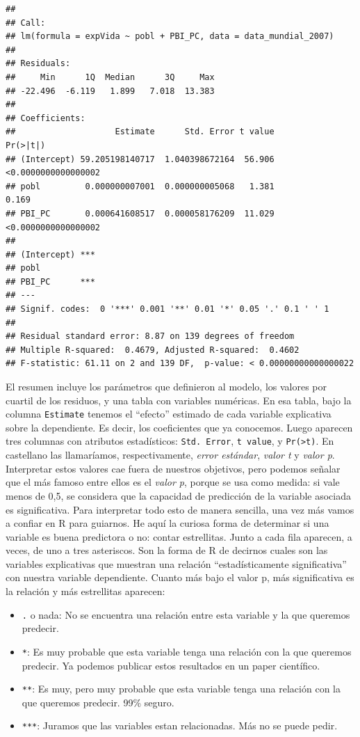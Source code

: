 \documentclass[]{book}
\providecommand{\tightlist}{%
  \setlength{\itemsep}{0pt}\setlength{\parskip}{0pt}}
\begin{document}
\begin{verbatim}
## 
## Call:
## lm(formula = expVida ~ pobl + PBI_PC, data = data_mundial_2007)
## 
## Residuals:
##     Min      1Q  Median      3Q     Max 
## -22.496  -6.119   1.899   7.018  13.383 
## 
## Coefficients:
##                    Estimate      Std. Error t value            Pr(>|t|)
## (Intercept) 59.205198140717  1.040398672164  56.906 <0.0000000000000002
## pobl         0.000000007001  0.000000005068   1.381               0.169
## PBI_PC       0.000641608517  0.000058176209  11.029 <0.0000000000000002
##                
## (Intercept) ***
## pobl           
## PBI_PC      ***
## ---
## Signif. codes:  0 '***' 0.001 '**' 0.01 '*' 0.05 '.' 0.1 ' ' 1
## 
## Residual standard error: 8.87 on 139 degrees of freedom
## Multiple R-squared:  0.4679, Adjusted R-squared:  0.4602 
## F-statistic: 61.11 on 2 and 139 DF,  p-value: < 0.00000000000000022
\end{verbatim}

El resumen incluye los parámetros que definieron al modelo, los valores
por cuartil de los residuos, y una tabla con variables numéricas. En esa
tabla, bajo la columna \texttt{Estimate} tenemos el ``efecto'' estimado
de cada variable explicativa sobre la dependiente. Es decir, los
coeficientes que ya conocemos. Luego aparecen tres columnas con
atributos estadísticos: \texttt{Std.\ Error}, \texttt{t\ value}, y
\texttt{Pr(\textgreater{}\textbar{}t\textbar{})}. En castellano las
llamaríamos, respectivamente, \emph{error estándar}, \emph{valor t} y
\emph{valor p}. Interpretar estos valores cae fuera de nuestros
objetivos, pero podemos señalar que el más famoso entre ellos es el
\emph{valor p}, porque se usa como medida: si vale menos de 0,5, se
considera que la capacidad de predicción de la variable asociada es
significativa. Para interpretar todo esto de manera sencilla, una vez
más vamos a confiar en R para guiarnos. He aquí la curiosa forma de
determinar si una variable es buena predictora o no: contar estrellitas.
Junto a cada fila aparecen, a veces, de uno a tres asteriscos. Son la
forma de R de decirnos cuales son las variables explicativas que
muestran una relación ``estadísticamente significativa'' con nuestra
variable dependiente. Cuanto más bajo el valor p, más significativa es
la relación y más estrellitas aparecen:

\begin{itemize}
\tightlist
\item
  \texttt{.} o nada: No se encuentra una relación entre esta variable y
  la que queremos predecir.
\item
  \texttt{*}: Es muy probable que esta variable tenga una relación con
  la que queremos predecir. Ya podemos publicar estos resultados en un
  paper científico.
\item
  \texttt{**}: Es muy, pero muy probable que esta variable tenga una
  relación con la que queremos predecir. 99\% seguro.
\item
  \texttt{***}: Juramos que las variables estan relacionadas. Más no se
  puede pedir.
\end{itemize}
\end{document}
